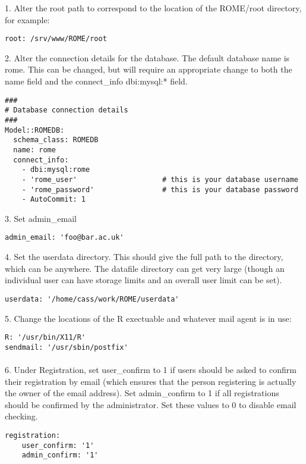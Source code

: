 1. Alter the root path to correspond to the location of the ROME/root directory, for example:

\begin{verbatim}
root: /srv/www/ROME/root
 \end{verbatim}

2. Alter the connection details for the database. The default database name is rome. This can be changed, but will require an appropriate change to both the name field and the connect\_info dbi:mysql:* field. 

\begin{verbatim}
###
# Database connection details 
###
Model::ROMEDB:
  schema_class: ROMEDB
  name: rome
  connect_info:
    - dbi:mysql:rome
    - 'rome_user'                    # this is your database username
    - 'rome_password'                # this is your database password
    - AutoCommit: 1
\end{verbatim}

3. Set admin\_email 

\begin{verbatim}
admin_email: 'foo@bar.ac.uk'
\end{verbatim}

4. Set the userdata directory. This should give the full path to the directory, which can be anywhere. The datafile directory can get very large (though an individual user can have storage limits and an overall user limit can be set).

\begin{verbatim}
userdata: '/home/cass/work/ROME/userdata'
\end{verbatim}


5. Change the locations of the R exectuable and whatever mail agent is in use:

\begin{verbatim}
R: '/usr/bin/X11/R'
sendmail: '/usr/sbin/postfix'
\end{verbatim}

\paragraph{}
6. Under Registration, set user\_confirm to 1 if users should be asked to confirm their registration by email (which ensures that the person registering is actually the owner of the email address). Set admin\_confirm to 1 if all registrations should be confirmed by the administrator. Set these values to 0 to disable email checking.

\begin{verbatim}
registration:
    user_confirm: '1'
    admin_confirm: '1'
\end{verbatim}

